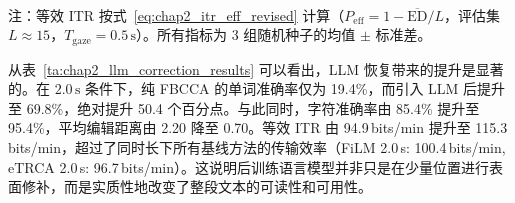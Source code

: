 \begin{table}[htbp]
\label{ta:chap2_llm_correction_results}
\renewcommand{\arraystretch}{1.8}
\centering
{}
\\[0.35em]
{\small 注：等效 ITR 按式~\eqref{eq:chap2_itr_eff_revised} 计算（$P_{\mathrm{eff}}=1-\overline{\mathrm{ED}}/L$，评估集 $L\approx 15$，$T_{\mathrm{gaze}}=0.5\,\mathrm{s}$）。所有指标为 3 组随机种子的均值 $\pm$ 标准差。}
\end{table}



从表~\ref{ta:chap2_llm_correction_results} 可以看出，LLM 恢复带来的提升是显著的。在 $2.0\,\mathrm{s}$ 条件下，纯 FBCCA 的单词准确率仅为 19.4\%，而引入 LLM 后提升至 69.8\%，绝对提升 50.4 个百分点。与此同时，字符准确率由 85.4\% 提升至 95.4\%，平均编辑距离由 2.20 降至 0.70。等效 ITR 由 94.9\,bits/min 提升至 115.3\,bits/min，超过了同时长下所有基线方法的传输效率（FiLM 2.0\,s: 100.4\,bits/min, eTRCA 2.0\,s: 96.7\,bits/min）。这说明后训练语言模型并非只是在少量位置进行表面修补，而是实质性地改变了整段文本的可读性和可用性。

